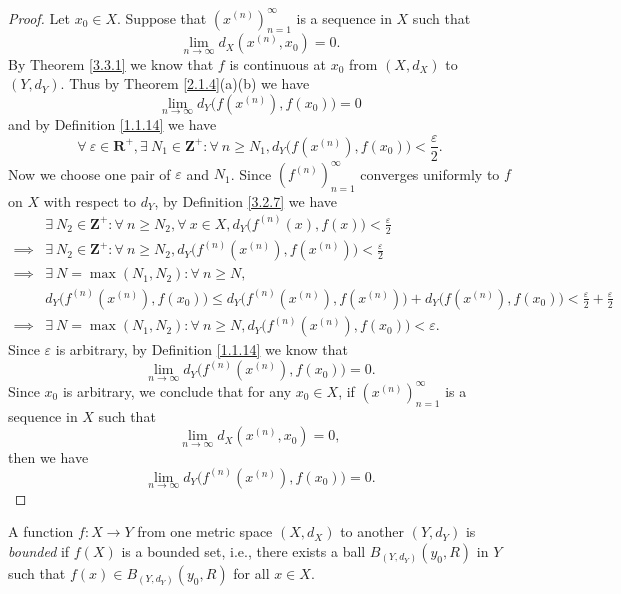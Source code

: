 \begin{proof}
    Let \(x_0 \in X\).
    Suppose that \((x^{(n)})_{n = 1}^\infty\) is a sequence in \(X\) such that
    \[
        \lim_{n \to \infty} d_X(x^{(n)}, x_0) = 0.
    \]
    By Theorem \ref{3.3.1} we know that \(f\) is continuous at \(x_0\) from \((X, d_X)\) to \((Y, d_Y)\).
    Thus by Theorem \ref{2.1.4}(a)(b) we have
    \[
        \lim_{n \to \infty} d_Y\big(f(x^{(n)}), f(x_0)\big) = 0
    \]
    and by Definition \ref{1.1.14} we have
    \[
        \forall\ \varepsilon \in \mathbf{R}^+, \exists\ N_1 \in \mathbf{Z}^+ : \forall\ n \geq N_1, d_Y\big(f(x^{(n)}), f(x_0)\big) < \frac{\varepsilon}{2}.
    \]
    Now we choose one pair of \(\varepsilon\) and \(N_1\).
    Since \((f^{(n)})_{n = 1}^\infty\) converges uniformly to \(f\) on \(X\) with respect to \(d_Y\), by Definition \ref{3.2.7} we have
    \begin{align*}
                 & \exists\ N_2 \in \mathbf{Z}^+ : \forall\ n \geq N_2, \forall\ x \in X, d_Y\big(f^{(n)}(x), f(x)\big) < \frac{\varepsilon}{2}                                           \\
        \implies & \exists\ N_2 \in \mathbf{Z}^+ : \forall\ n \geq N_2, d_Y\big(f^{(n)}(x^{(n)}), f(x^{(n)})\big) < \frac{\varepsilon}{2}                                                 \\
        \implies & \exists\ N = \max(N_1, N_2) : \forall\ n \geq N,                                                                                                                       \\
                 & d_Y\big(f^{(n)}(x^{(n)}), f(x_0)\big) \leq d_Y\big(f^{(n)}(x^{(n)}), f(x^{(n)})\big) + d_Y\big(f(x^{(n)}), f(x_0)\big) < \frac{\varepsilon}{2} + \frac{\varepsilon}{2} \\
        \implies & \exists\ N = \max(N_1, N_2) : \forall\ n \geq N, d_Y\big(f^{(n)}(x^{(n)}), f(x_0)\big) < \varepsilon.
    \end{align*}
    Since \(\varepsilon\) is arbitrary, by Definition \ref{1.1.14} we know that
    \[
        \lim_{n \to \infty} d_Y\big(f^{(n)}(x^{(n)}), f(x_0)\big) = 0.
    \]
    Since \(x_0\) is arbitrary, we conclude that for any \(x_0 \in X\), if \((x^{(n)})_{n = 1}^\infty\) is a sequence in \(X\) such that
    \[
        \lim_{n \to \infty} d_X(x^{(n)}, x_0) = 0,
    \]
    then we have
    \[
        \lim_{n \to \infty} d_Y\big(f^{(n)}(x^{(n)}), f(x_0)\big) = 0.
    \]
\end{proof}

\begin{definition}\label{3.3.5}
    A function \(f : X \to Y\) from one metric space \((X, d_X)\) to another \((Y, d_Y)\) is \emph{bounded} if \(f(X)\) is a bounded set, i.e., there exists a ball \(B_{(Y, d_Y)}(y_0, R)\) in \(Y\) such that \(f(x) \in B_{(Y, d_Y)}(y_0, R)\) for all \(x \in X\).
\end{definition}

